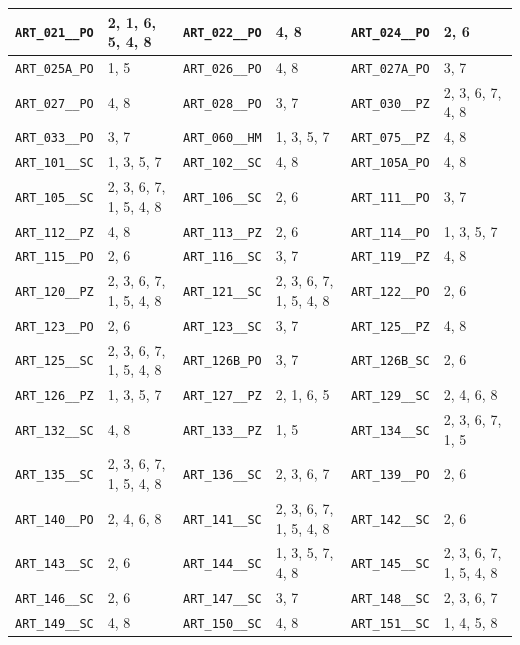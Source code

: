 \begin{longtable}{|l|l||l|l||l|l|}
    \verb|ART_021__PO| & 2, 1, 6, 5, 4, 8 & \verb|ART_022__PO| & 4, 8 & \verb|ART_024__PO| & 2, 6\\\hline
    \verb|ART_025A_PO| & 1, 5 & \verb|ART_026__PO| & 4, 8 & \verb|ART_027A_PO| & 3, 7\\\hline
    \verb|ART_027__PO| & 4, 8 & \verb|ART_028__PO| & 3, 7 & \verb|ART_030__PZ| & 2, 3, 6, 7, 4, 8\\\hline
    \verb|ART_033__PO| & 3, 7 & \verb|ART_060__HM| & 1, 3, 5, 7 & \verb|ART_075__PZ| & 4, 8\\\hline
    \verb|ART_101__SC| & 1, 3, 5, 7 & \verb|ART_102__SC| & 4, 8 & \verb|ART_105A_PO| & 4, 8\\\hline
    \verb|ART_105__SC| & 2, 3, 6, 7, 1, 5, 4, 8 & \verb|ART_106__SC| & 2, 6 & \verb|ART_111__PO| & 3, 7\\\hline
    \verb|ART_112__PZ| & 4, 8 & \verb|ART_113__PZ| & 2, 6 & \verb|ART_114__PO| & 1, 3, 5, 7\\\hline
    \verb|ART_115__PO| & 2, 6 & \verb|ART_116__SC| & 3, 7 & \verb|ART_119__PZ| & 4, 8\\\hline
    \verb|ART_120__PZ| & 2, 3, 6, 7, 1, 5, 4, 8 & \verb|ART_121__SC| & 2, 3, 6, 7, 1, 5, 4, 8 & \verb|ART_122__PO| & 2, 6\\\hline
    \verb|ART_123__PO| & 2, 6 & \verb|ART_123__SC| & 3, 7 & \verb|ART_125__PZ| & 4, 8\\\hline
    \verb|ART_125__SC| & 2, 3, 6, 7, 1, 5, 4, 8 & \verb|ART_126B_PO| & 3, 7 & \verb|ART_126B_SC| & 2, 6\\\hline
    \verb|ART_126__PZ| & 1, 3, 5, 7 & \verb|ART_127__PZ| & 2, 1, 6, 5 & \verb|ART_129__SC| & 2, 4, 6, 8\\\hline
    \verb|ART_132__SC| & 4, 8 & \verb|ART_133__PZ| & 1, 5 & \verb|ART_134__SC| & 2, 3, 6, 7, 1, 5\\\hline
    \verb|ART_135__SC| & 2, 3, 6, 7, 1, 5, 4, 8 & \verb|ART_136__SC| & 2, 3, 6, 7 & \verb|ART_139__PO| & 2, 6\\\hline
    \verb|ART_140__PO| & 2, 4, 6, 8 & \verb|ART_141__SC| & 2, 3, 6, 7, 1, 5, 4, 8 & \verb|ART_142__SC| & 2, 6\\\hline
    \verb|ART_143__SC| & 2, 6 & \verb|ART_144__SC| & 1, 3, 5, 7, 4, 8 & \verb|ART_145__SC| & 2, 3, 6, 7, 1, 5, 4, 8\\\hline
    \verb|ART_146__SC| & 2, 6 & \verb|ART_147__SC| & 3, 7 & \verb|ART_148__SC| & 2, 3, 6, 7\\\hline
    \verb|ART_149__SC| & 4, 8 & \verb|ART_150__SC| & 4, 8 & \verb|ART_151__SC| & 1, 4, 5, 8\\\hline

\end{longtable}
